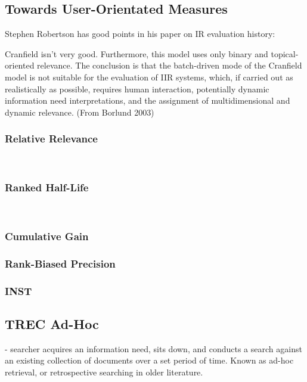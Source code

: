 \subsection{Towards User-Orientated Measures}

Stephen Robertson has good points in his paper on IR evaluation history:~\cite{robertson2008history_ir_evaluation}

Cranfield isn't very good. Furthermore, this model uses only binary and topical-oriented relevance. The conclusion is that the batch-driven mode of the Cranfield model is not suitable for the evaluation of IIR systems, which, if carried out as realistically as possible, requires human interaction, potentially dynamic information need interpretations, and the assignment of multidimensional and dynamic relevance. (From Borlund 2003)

\subsubsection{Relative Relevance}
~\cite{borlund1997iir_evaluation}

\subsubsection{Ranked Half-Life}
~\cite{borlund1997iir_evaluation}

\subsubsection{Cumulative Gain}

\subsubsection{Rank-Biased Precision}

\subsubsection{INST}


\subsection{TREC Ad-Hoc}\label{sec:ir_background:user:trec}
- searcher acquires an information need, sits down, and conducts a search against an existing collection of documents over a set period of time. Known as ad-hoc retrieval, or retrospective searching in older literature.

